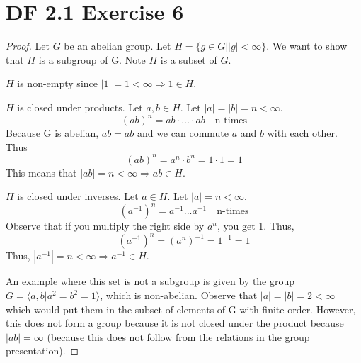 \documentclass{article}
\begin{document}
\section{DF 2.1 Exercise 6}
\begin{proof}
Let $G$ be an abelian group. Let $H=\{g \in G | |g| < \infty\}$. We want to show that $H$ is a subgroup of G. Note $H$ is a subset of $G$.

$H$ is non-empty since $|1| = 1 < \infty \Rightarrow 1 \in H$.

$H$ is closed under products. Let $a, b \in H$. Let $|a|=|b|=n<\infty$.
\[
(ab)^n = ab \cdot ... \cdot ab \quad \textrm{n-times}
\]
Because G is abelian, $ab=ab$ and we can commute $a$ and $b$ with each other. Thus
\[
(ab)^n = a^n \cdot b^n = 1 \cdot 1 = 1
\]
This means that $|ab| = n < \infty \Rightarrow ab \in H$.

$H$ is closed under inverses. Let $a \in H$. Let $|a|=n < \infty$. 
\[
(a^{-1})^n = a^{-1}...a^{-1} \quad \textrm{n-times}
\]
Observe that if you multiply the right side by $a^n$, you get 1. Thus,
\[
(a^{-1})^n = (a^n)^{-1} = 1^{-1} = 1
\]
Thus, $|a^{-1}| = n < \infty \Rightarrow a^{-1} \in H$.

An example where this set is not a subgroup is given by the group $G=\langle a, b | a^2=b^2=1 \rangle$, which is non-abelian. Observe that $|a|=|b|=2<\infty$ which would put them in the subset of elements of G with finite order. However, this does not form a group because it is not closed under the product because $|ab| = \infty$ (because this does not follow from the relations in the group presentation).
\end{proof}
\end{document}
